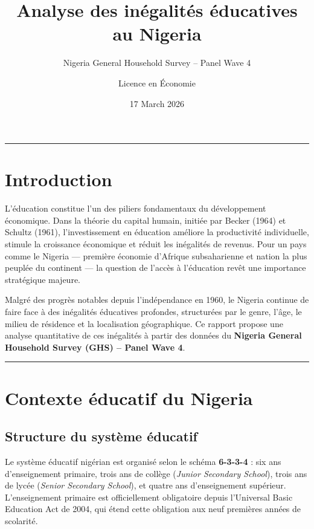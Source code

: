 \documentclass[
]{article}
\title{Analyse des inégalités éducatives au Nigeria}
\subtitle{Nigeria General Household Survey -- Panel Wave 4}
\author{Licence en Économie}
\date{17 March 2026}
\begin{document}
\maketitle

{
\setcounter{tocdepth}{2}
\tableofcontents
}
\begin{center}\rule{0.5\linewidth}{0.5pt}\end{center}

\section{Introduction}\label{introduction}

L'éducation constitue l'un des piliers fondamentaux du développement
économique. Dans la théorie du capital humain, initiée par Becker (1964)
et Schultz (1961), l'investissement en éducation améliore la
productivité individuelle, stimule la croissance économique et réduit
les inégalités de revenus. Pour un pays comme le Nigeria --- première
économie d'Afrique subsaharienne et nation la plus peuplée du continent
--- la question de l'accès à l'éducation revêt une importance
stratégique majeure.

Malgré des progrès notables depuis l'indépendance en 1960, le Nigeria
continue de faire face à des inégalités éducatives profondes,
structurées par le genre, l'âge, le milieu de résidence et la
localisation géographique. Ce rapport propose une analyse quantitative
de ces inégalités à partir des données du \textbf{Nigeria General
Household Survey (GHS) -- Panel Wave 4}.

\begin{center}\rule{0.5\linewidth}{0.5pt}\end{center}

\section{Contexte éducatif du
Nigeria}\label{contexte-uxe9ducatif-du-nigeria}

\subsection{Structure du système
éducatif}\label{structure-du-systuxe8me-uxe9ducatif}

Le système éducatif nigérian est organisé selon le schéma
\textbf{6-3-3-4} : six ans d'enseignement primaire, trois ans de collège
(\emph{Junior Secondary School}), trois ans de lycée (\emph{Senior
Secondary School}), et quatre ans d'enseignement supérieur.
L'enseignement primaire est officiellement obligatoire depuis
l'Universal Basic Education Act de 2004, qui étend cette obligation aux
neuf premières années de scolarité.
\end{document}
